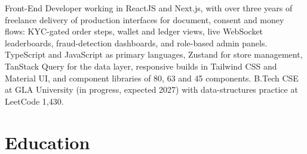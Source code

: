\documentclass[11pt,a4paper,sans]{moderncv}
\begin{document}
\makecvtitle


\vspace{4pt}
\small{Front-End Developer working in ReactJS and Next.js, with over three years of freelance delivery of production interfaces for document, consent and money flows: KYC-gated order steps, wallet and ledger views, live WebSocket leaderboards, fraud-detection dashboards, and role-based admin panels. TypeScript and JavaScript as primary languages, Zustand for store management, TanStack Query for the data layer, responsive builds in Tailwind CSS and Material UI, and component libraries of 80, 63 and 45 components. B.Tech CSE at GLA University (in progress, expected 2027) with data-structures practice at LeetCode 1,430.}


\section{Education}
\vspace{1pt}

\end{document}
